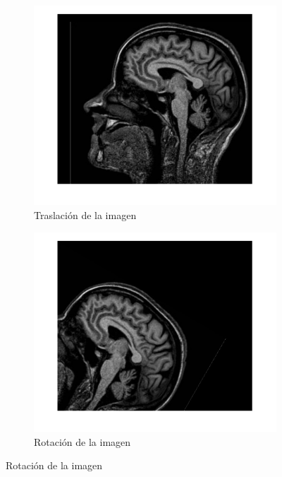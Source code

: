 \documentclass[11pt, letterpaper]{article}
\begin{document}
\begin{figure}[h!]
	\centering
	\begin{subfigure}[b]{0.45\textwidth}
		\includegraphics[width=\textwidth]{IMG/R1.jpg}
		\caption{Traslación de la imagen}
		\label{fig:r1}
	\end{subfigure}\hfill
	\begin{subfigure}[b]{0.45\textwidth}
		\includegraphics[width=\textwidth]{IMG/R2.jpg}
		\caption{Rotación de la imagen}
		\label{fig:r2}
	\end{subfigure}
	\vspace{\baselineskip} %

\end{figure}
\end{document}
